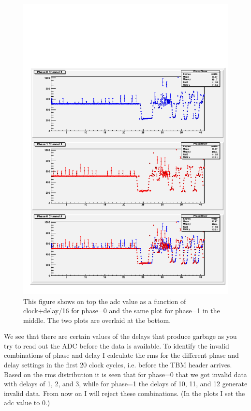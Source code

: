 \begin{figure}
\begin{center}
\includegraphics[width=\linewidth]{phaseAndDelayPlotRaw_channe_1_1}
\end{center}
\caption{This figure shows on top the adc value as a function of clock+delay/16 for phase=0 and the same plot for phase=1 in the middle. The two plots are overlaid at the bottom.}
\label{fig:phasedelayraw}
\end{figure}

We see that there are certain values of the delays that produce garbage as you try to read out the ADC before the data is available. To identify the invalid combinations of phase and delay I calculate the rms for the different phase and delay settings in the first 20 clock cycles, i.e. before the TBM header arrives. Based on the rms distribution it is seen that for phase=0 that we got invalid data with delays of 1, 2, and 3, while for phase=1 the delays of 10, 11, and 12 generate invalid data. From now on I will reject these combinations. (In the plots I set the adc value to 0.)

